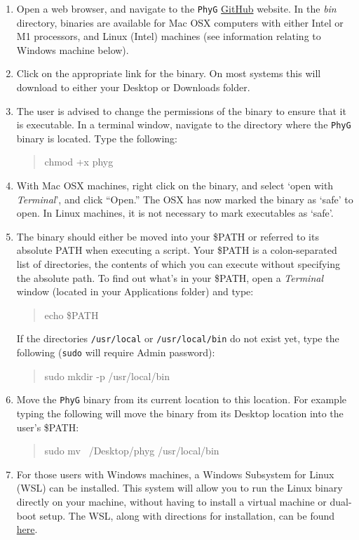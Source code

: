 \documentclass[11pt]{article}
\newcommand{\phyg}{\texttt{PhyG} }
\begin{document}
\begin{enumerate}
\item Open a web browser, and navigate to the \phyg \href{https://github.com/amnh/PhyGraph}
{GitHub} website. In the \emph{bin} directory, binaries are available for Mac OSX 
computers with either Intel or M1 processors, and Linux (Intel) machines (see information 
relating to Windows machine below).

\item Click on the appropriate link for the binary. On most systems this will 
download to either your Desktop or Downloads folder. 

\item The user is advised to change the permissions of the binary to ensure
that it is executable. In a terminal window, navigate to the directory where the \phyg
binary is located. Type the following:

	\begin{quote}
	chmod +x phyg
	\end{quote}

\item With Mac OSX machines, right click on the binary, and select `open with 
\emph{Terminal}', and click ``Open.'' The OSX has now marked the binary as `safe' 
to open. In Linux machines, it is not necessary to mark executables as `safe'.

\item The binary should either be moved into your \$PATH or referred to its 
absolute PATH when executing a script. Your \$PATH is a colon-separated list 
of directories, the contents of which you can execute without specifying the 
absolute path. To find out what's in your \$PATH, open a \textit{Terminal} window 
(located in your Applications folder) and type: 

	\begin{quote}
	echo \$PATH
	\end{quote}

If the directories \texttt{/usr/local} or \texttt{/usr/local/bin} do not exist yet, type the 
following (\texttt{sudo} will require Admin password): 

	\begin{quote}
	sudo mkdir -p /usr/local/bin
	\end{quote}


\item Move the \phyg binary from its current location to this location. For example 
typing the following will move the binary from its Desktop location into the user's 
\$PATH:

	\begin{quote}
	sudo mv ~/Desktop/phyg /usr/local/bin
	\end{quote}
	
\item For those users with Windows machines, a Windows Subsystem for Linux 
(WSL) can be installed. This system will allow you to run the Linux binary directly 
on your machine, without having to install a virtual machine or dual-boot setup. 
The WSL, along with directions for installation, can be found 
\href{https://learn.microsoft.com/en-us/windows/wsl/}{here}.
\end{enumerate}
\end{document}
